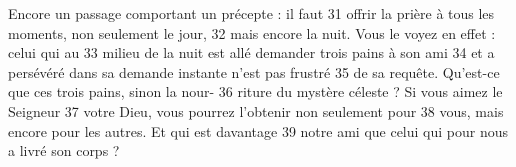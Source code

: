 	Encore un passage comportant un précepte : il faut	 
31	 	offrir la prière à tous les moments, non seulement le jour,	 
32	 	mais encore la nuit. Vous le voyez en effet : celui qui au	 
33	 	milieu de la nuit est allé demander trois pains à son ami	 
34	 	et a persévéré dans sa demande instante n'est pas frustré	 
35	 	de sa requête. Qu'est-ce que ces trois pains, sinon la nour-	 
36	 	riture du mystère céleste ? Si vous aimez le Seigneur	 
37	 	votre Dieu, vous pourrez l'obtenir non seulement pour	 
38	 	vous, mais encore pour les autres. Et qui est davantage	 
39	 	notre ami que celui qui pour nous a livré son corps ?